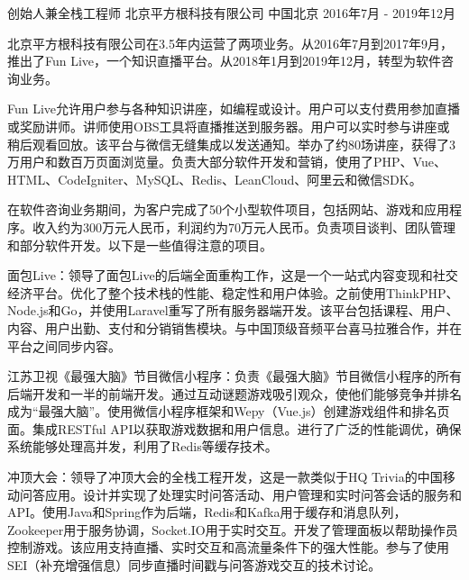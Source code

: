 \begin{cventries}
\cventry
{创始人兼全栈工程师} %
{北京平方根科技有限公司} %
{中国北京} %
{2016年7月 - 2019年12月} %
{
  \begin{cvitems} %
    \item {北京平方根科技有限公司在3.5年内运营了两项业务。从2016年7月到2017年9月，推出了Fun Live，一个知识直播平台。从2018年1月到2019年12月，转型为软件咨询业务。}
    \item {Fun Live允许用户参与各种知识讲座，如编程或设计。用户可以支付费用参加直播或奖励讲师。讲师使用OBS工具将直播推送到服务器。用户可以实时参与讲座或稍后观看回放。该平台与微信无缝集成以发送通知。举办了约80场讲座，获得了3万用户和数百万页面浏览量。负责大部分软件开发和营销，使用了PHP、Vue、HTML、CodeIgniter、MySQL、Redis、LeanCloud、阿里云和微信SDK。}
    \item {在软件咨询业务期间，为客户完成了50个小型软件项目，包括网站、游戏和应用程序。收入约为300万元人民币，利润约为70万元人民币。负责项目谈判、团队管理和部分软件开发。以下是一些值得注意的项目。}
    \item {面包Live：领导了面包Live的后端全面重构工作，这是一个一站式内容变现和社交经济平台。优化了整个技术栈的性能、稳定性和用户体验。之前使用ThinkPHP、Node.js和Go，并使用Laravel重写了所有服务器端开发。该平台包括课程、用户、内容、用户出勤、支付和分销销售模块。与中国顶级音频平台喜马拉雅合作，并在平台之间同步内容。}
    \item {江苏卫视《最强大脑》节目微信小程序：负责《最强大脑》节目微信小程序的所有后端开发和一半的前端开发。通过互动谜题游戏吸引观众，使他们能够竞争并排名成为“最强大脑”。使用微信小程序框架和Wepy（Vue.js）创建游戏组件和排名页面。集成RESTful API以获取游戏数据和用户信息。进行了广泛的性能调优，确保系统能够处理高并发，利用了Redis等缓存技术。}
    \item {冲顶大会：领导了冲顶大会的全栈工程开发，这是一款类似于HQ Trivia的中国移动问答应用。设计并实现了处理实时问答活动、用户管理和实时问答会话的服务和API。使用Java和Spring作为后端，Redis和Kafka用于缓存和消息队列，Zookeeper用于服务协调，Socket.IO用于实时交互。开发了管理面板以帮助操作员控制游戏。该应用支持直播、实时交互和高流量条件下的强大性能。参与了使用SEI（补充增强信息）同步直播时间戳与问答游戏交互的技术讨论。}
  \end{cvitems}
}


\end{cventries}
